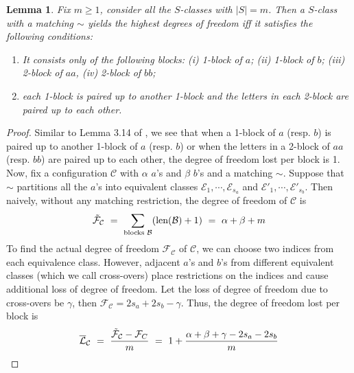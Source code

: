\documentclass[12pt,reqno]{amsart}
\theoremstyle{plain} %
\newtheorem{lemma}[theorem]{Lemma}
\theoremstyle{remark}
\theoremstyle{definition}
\renewcommand{\a}{\alpha}
\renewcommand{\b}{\beta}
\newcommand{\abs}[1]{\left|#1\right|}
\begin{document}
\begin{lemma}\label{blockslemma}
Fix $m\geq 1$, consider all the $S$-classes with $\abs{S}=m$. Then a $S$-class with a matching $\sim$ yields the highest degrees of freedom iff it satisfies the following conditions:
\begin{enumerate}
\item It consists only of the following blocks: (i) 1-block of $a$; (ii) 1-block of $b$; (iii) 2-block of $aa$, (iv) 2-block of $bb$;
\item each 1-block is paired up to another 1-block and the letters in each 2-block are paired up to each other.
\end{enumerate}
 
\end{lemma}
\begin{proof}
Similar to Lemma 3.14 of \cite{split}, we see that when a 1-block of $a$ (resp. $b$) is paired up to another 1-block of $a$ (resp. $b$) or when the letters in a 2-block of $aa$ (resp. $bb$) are paired up to each other, the degree of freedom lost per block is 1. Now, fix a configuration $\mathcal{C}$ with $\a$ $a$'s and $\b$ $b$'s and a matching $\sim$. Suppose that $\sim$ partitions all the $a$'s into equivalent classes $\mathcal{E}_1, \cdots, \mathcal{E}_{s_a}$ and $\mathcal{E}'_1, \cdots, \mathcal{E}'_{s_b}$. Then naively, without any matching restriction, the degree of freedom of $\mathcal{C}$ is
\begin{align*}
\mathcal{\Tilde{F}}_{\mathcal{C}} \ = \ \sum_{\textup{blocks } \mathcal{B}}(\textup{len}(\mathcal{B})+1) \ = \ \a+\b+m
\end{align*}
To find the actual degree of freedom $\mathcal{F}_\mathcal{C}$ of $\mathcal{C}$, we can choose two indices from each equivalence class. However, adjacent $a$'s and $b$'s from different equivalent classes (which we call cross-overs) place restrictions on the indices and cause additional loss of degree of freedom. Let the loss of degree of freedom due to cross-overs be $\gamma$, then $\mathcal{F}_\mathcal{C}=2s_a+2s_b-\gamma$. Thus, the degree of freedom lost per block is
\begin{equation}\label{degreeoffreedom}
\mathcal{\overline{L}}_\mathcal{C} \ = \ \frac{\mathcal{\Tilde{F}_C}-\mathcal{F}_C}{m} \ = \ 1+\frac{\a+\b+\gamma-2s_a-2s_b}{m} 
\end{equation}

\end{proof}
\end{document}
